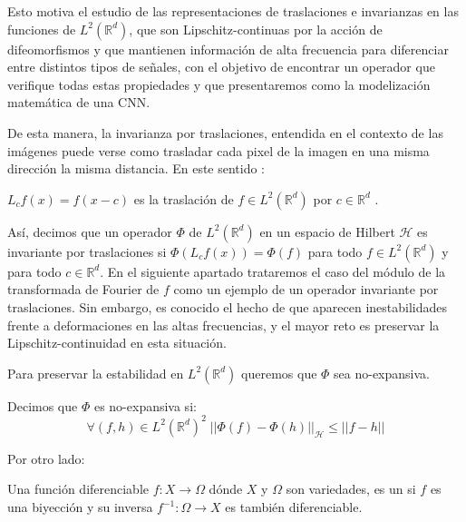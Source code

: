 \medskip


\noindent Esto motiva el estudio de las representaciones de traslaciones e invarianzas en las funciones de $L^2(\mathbb{R}^d)$, que son Lipschitz-continuas por la acción de difeomorfismos y que mantienen información de alta frecuencia para diferenciar entre distintos tipos de señales, con el objetivo de encontrar un operador que verifique todas estas propiedades y que presentaremos como la modelización matemática de una CNN.

\medskip

\noindent De esta manera, la invarianza por traslaciones, entendida en el contexto de las imágenes puede verse como trasladar cada pixel de la imagen en una misma dirección la misma distancia. En este sentido : 

\begin{definicion}
$L_cf(x)=f(x-c)$ es la traslación de $f \in L^2(\mathbb{R}^d)$ por $c \in \mathbb{R}^d$ .
\end{definicion}

\noindent Así, decimos que un operador $\Phi$ de  $L^2(\mathbb{R}^d)$ en un espacio de Hilbert $\mathcal{H}$ es invariante por traslaciones si $\Phi(L_cf(x))=\Phi(f)$ para todo $f \in L^2(\mathbb{R}^d)$ y para todo $c \in \mathbb{R}^d$. En el siguiente apartado trataremos el caso del módulo de la transformada de Fourier de $f$ como un ejemplo de un operador invariante por traslaciones. Sin embargo, es conocido el hecho de que aparecen inestabilidades frente a deformaciones en las altas frecuencias, y el mayor reto es preservar la Lipschitz-continuidad en esta situación.

\medskip

\noindent Para preservar la estabilidad en $L^2(\mathbb{R}^d)$ queremos que $\Phi$ sea no-expansiva. 

\begin{definicion}
Decimos que $\Phi$ es no-expansiva si: 
$$\forall (f,h) \in L^2(\mathbb{R}^d)^2 \; || \Phi(f)-\Phi(h)||_\mathcal{H} \leq ||f-h||$$
\end{definicion}

\noindent Por otro lado: 


\begin{definicion}
  Una función diferenciable $f: X \rightarrow \Omega$ dónde $X$ y $\Omega$ son variedades, es un  si $f$ es una biyección y su inversa $f^{-1}:\Omega \rightarrow X$ es también diferenciable. 
\end{definicion}


